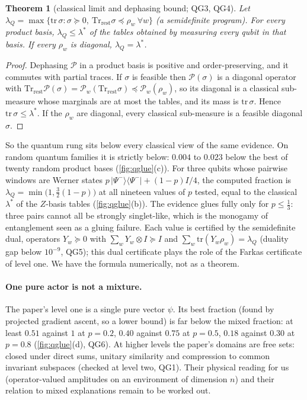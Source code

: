 \documentclass[11pt]{article}
\newtheorem{theorem}{Theorem}\newtheorem{proposition}[theorem]{Proposition}\newtheorem{corollary}[theorem]{Corollary}
\theoremstyle{definition}\newtheorem{definition}[theorem]{Definition}\newtheorem{remark}[theorem]{Remark}\newtheorem{example}[theorem]{Example}
\begin{document}
\begin{theorem}[classical limit and dephasing bound; QG3, QG4]\label{thm:dephase}
Let $\lambda_Q=\max\{\mathrm{tr}\,\sigma:\sigma\succeq0,\ \mathrm{Tr}_{\mathrm{rest}}\sigma\preceq\rho_w\ \forall w\}$ (a semidefinite program). For every
product basis, $\lambda_Q\le\lambda^*$ of the tables obtained by measuring every qubit in that basis. If every $\rho_w$ is diagonal,
$\lambda_Q=\lambda^*$.
\end{theorem}

\begin{proof}
Dephasing $\mathcal P$ in a product basis is positive and order-preserving, and it commutes with partial traces. If $\sigma$ is feasible then
$\mathcal P(\sigma)$ is a diagonal operator with $\mathrm{Tr}_{\mathrm{rest}}\mathcal P(\sigma)=\mathcal P_w(\mathrm{Tr}_{\mathrm{rest}}\sigma)\preceq
\mathcal P_w(\rho_w)$, so its diagonal is a classical sub-measure whose marginals are at most the tables, and its mass is $\mathrm{tr}\,\sigma$. Hence
$\mathrm{tr}\,\sigma\le\lambda^*$. If the $\rho_w$ are diagonal, every classical sub-measure is a feasible diagonal $\sigma$.
\end{proof}

So the quantum rung sits below every classical view of the same evidence. On random quantum families it is strictly below: $0.004$ to
$0.023$ below the best of twenty random product bases (\cref{fig:qglue}(c)). For three qubits whose pairwise windows are Werner states
$p\,|\Psi^-\rangle\langle\Psi^-|+(1-p)I/4$, the computed fraction is $\lambda_Q=\min\big(1,\tfrac32(1-p)\big)$ at all nineteen values of $p$
tested, equal to the classical $\lambda^*$ of the $Z$-basis tables (\cref{fig:qglue}(b)). The evidence glues fully only for $p\le\tfrac13$: three
pairs cannot all be strongly singlet-like, which is the monogamy of entanglement seen as a gluing failure. Each value is certified by the
semidefinite dual, operators $Y_w\succeq0$ with $\sum_wY_w\otimes I\succeq I$ and $\sum_w\mathrm{tr}(Y_w\rho_w)=\lambda_Q$ (duality gap
below $10^{-9}$, QG5); this dual certificate plays the role of the Farkas certificate of level one. We have the formula numerically, not as
a theorem.

\paragraph{One pure actor is not a mixture.}
The paper's level one is a single pure vector $\psi$. Its best fraction (found by projected gradient ascent, so a lower bound) is far below
the mixed fraction: at least $0.51$ against $1$ at $p=0.2$, $0.40$ against $0.75$ at $p=0.5$, $0.18$ against $0.30$ at $p=0.8$
(\cref{fig:qglue}(d), QG6). At higher levels the paper's domains are free sets: closed under direct sums, unitary similarity and compression
to common invariant subspaces (checked at level two, QG1). Their physical reading for us (operator-valued amplitudes on an environment of
dimension $n$) and their relation to mixed explanations remain to be worked out.
\end{document}
